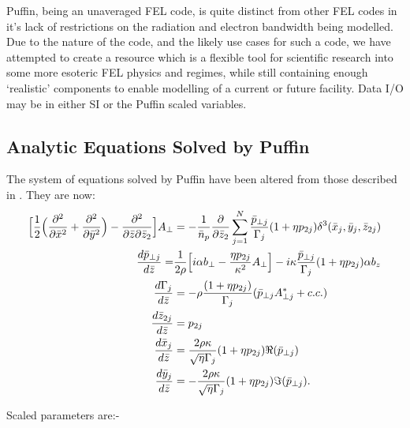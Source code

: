 \documentclass[12pt]{article}%
\begin{document}
Puffin, being an unaveraged FEL code, is quite distinct from other FEL codes in it's lack of restrictions on the radiation and electron bandwidth being modelled. Due to the nature of the code, and the likely use cases for such a code, we have attempted to create a resource which is a flexible tool for scientific research into some more esoteric FEL physics and regimes, while still containing enough `realistic'  components to enable modelling of a current or future facility. Data I/O may be in either SI or the Puffin scaled variables.


\subsection{Analytic Equations Solved by Puffin}


The system of equations solved by Puffin have been altered from those described in \cite{puffin}. They are now:
\begin{align}
\Bigl[\frac{1}{2}\Bigl(\frac{\partial^2}{\partial\bar{x}^2} + \frac{\partial^2}{\partial\bar{y}^2}\Bigr) -  \frac{\partial^2}{\partial\bar{z}\partial\bar{z}_2}\Bigr]A_{\bot}  & = -\frac{1}{\bar{n}_p}\frac{\partial}{\partial \bar{z}_2}\sum_{j=1}^{N} \frac{\bar{p}_{\bot j}}{\Gamma_j} (1+\eta p_{2j})     \delta^3(\bar{x}_j,\bar{y}_j,\bar{z}_{2j})  \label{fieldeq2} \\
\frac{d \bar{p}_{\bot j}}{d \bar{z}} = & \frac{1}{2\rho}\Bigl[ i \alpha b_{\bot} - \frac{\eta p_{2j}}{\kappa^2}A_{\bot} \Bigr] - i\kappa \frac{ \bar{p}_{\bot j}}{\Gamma_j} (1 + \eta p_{2j})  \alpha b_z \label{pperpeqn2} \\
\frac{d \Gamma_{j}}{d \bar{z}} &= - \rho \frac{(1 + \eta p_{2j})}{\Gamma_j} (\bar{p}_{\bot j} A^*_{\bot j} + c.c.)  \label{gameqn} \\
\frac{d\bar{z}_{2j}}{d\bar{z}}& = p_{2j}  \label{z2eqgen2} \\
\frac{d\bar{x}_j}{d\bar{z}} &=  \frac{2 \rho \kappa}{\sqrt{\eta} \Gamma_j} (1 + \eta p_{2j}) \Re(\bar{p}_{\bot j}) \label{xeqgen2} \\
\frac{d\bar{y}_j}{d\bar{z}} &= - \frac{2 \rho \kappa}{\sqrt{\eta} \Gamma_j}  (1 + \eta p_{2j}) \Im(\bar{p}_{\bot j}). \label{yeqgen2}
\end{align}



Scaled parameters are:-


\end{document}
